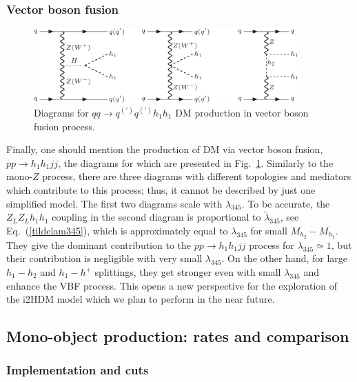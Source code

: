 \documentclass[12pt,a4paper]{article}
\begin{document}
\subsubsection{Vector boson fusion}

\begin{figure}[h!]
\begin{center}
\includegraphics[width=0.9\textwidth]{fd-vbf.pdf} 
\caption{Diagrams for $qq\to q^{(')}q^{(')} h_1 h_1$ DM production in vector boson
  fusion process.}
\label{fig:fd-vbf}
\end{center}
\end{figure}
%
Finally, one should mention the production of DM via vector boson fusion, $pp\to h_1 h_1 jj$, the diagrams for which are
presented in Fig.~\ref{fig:fd-vbf}.
Similarly to the mono-$Z$ process, there are three diagrams with different
topologies and mediators which contribute to this process; thus,
it cannot be described by  just one simplified model.
The first two diagrams scale with $\lambda_{345}$.
To be accurate, the $Z_L Z_L h_1 h_1$ coupling in the second diagram is proportional to 
$\tilde\lambda_{345}$, see Eq.~(\ref{tildelam345}), which is approximately equal to $\lambda_{345}$ for small 
$M_{h_2}-M_{h_1}$.
They give the dominant contribution to the  $pp\to h_1 h_1 jj$ process for $\lambda_{345}\simeq 1$,
but their contribution is negligible with very small $\lambda_{345}$.
On the other hand, for large $h_1-h_2$ and $h_1-h^+$ splittings,
they get stronger even with small $\lambda_{345}$ and enhance the VBF process.
This opens a new  perspective for the exploration of the i2HDM model 
which we plan to perform in the near future.

\subsection{Mono-object production: rates and comparison}

\subsubsection{Implementation and cuts}
\end{document}
